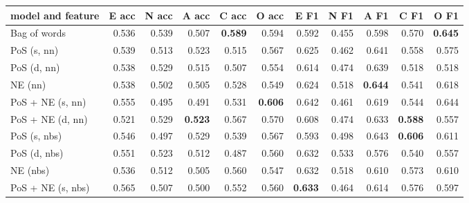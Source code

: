 \documentclass[10pt, a4paper]{article}
\begin{document}
\begin{table}
  \begin{center}
  \begin{tabular}{lrrrrrrrrrr}
    \toprule
    model and feature  &  E acc         & N acc          & A acc          & C acc          &  O acc         & E F1           & N F1           & A F1           & C F1           & O F1\\
    \midrule
          Bag of words & 0.536          & 0.539          & 0.507          & \textbf{0.589} & 0.594          & 0.592          & 0.455          & 0.598          & 0.570          &  \textbf{0.645}\\
           PoS (s, nn) & 0.539          & 0.513          & 0.523          & 0.515          & 0.567          & 0.625          & 0.462          & 0.641          & 0.558          &  0.575\\
           PoS (d, nn) & 0.538          & 0.529          & 0.515          & 0.507          & 0.554          & 0.614          & 0.474          & 0.639          & 0.518          &  0.518\\
               NE (nn) & 0.538          & 0.502          & 0.505          & 0.528          & 0.549          & 0.624          & 0.518          & \textbf{0.644} & 0.541          &  0.618\\
      PoS + NE (s, nn) & 0.555          & 0.495          & 0.491          & 0.531          & \textbf{0.606} & 0.642          & 0.461          & 0.619          & 0.544          &  0.644\\
      PoS + NE (d, nn) & 0.521          & 0.529          & \textbf{0.523} & 0.567          & 0.570          & 0.608          & 0.474          & 0.633          & \textbf{0.588} &  0.557\\
          PoS (s, nbs) & 0.546          & 0.497          & 0.529          & 0.539          & 0.567          & 0.593          & 0.498          & 0.643          & \textbf{0.606} &  0.611\\
          PoS (d, nbs) & 0.551          & 0.523          & 0.512          & 0.487          & 0.560          & 0.632          & 0.533          & 0.576          & 0.540          &  0.557\\
              NE (nbs) & 0.536          & 0.512          & 0.505          & 0.560          & 0.547          & 0.632          & 0.518          & 0.610          & 0.573          &  0.610\\
     PoS + NE (s, nbs) & 0.565          & 0.507          & 0.500          & 0.552          & 0.560          & \textbf{0.633} & 0.464          & 0.614          & 0.576          &  0.597\\

\end{tabular}
\end{center}
\end{table}
\end{document}
